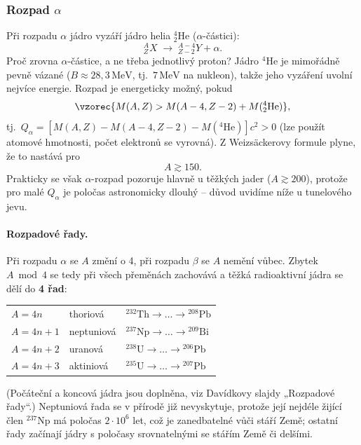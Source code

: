 \subsubsection{Rozpad \texorpdfstring{\(\alpha\)}{alfa}}

Při rozpadu \(\alpha\) jádro vyzáří jádro helia \({}^4_2\mathrm{He}\) (\(\alpha\)-částici):
\[
  {}^A_Z X \;\to\; {}^{A-4}_{Z-2} Y + \alpha .
\]
Proč zrovna \(\alpha\)-částice, a ne třeba jednotlivý proton? Jádro \({}^4\mathrm{He}\) je mimořádně pevně vázané
(\(B\approx 28{,}3\,\mathrm{MeV}\), tj.\ \(7\,\mathrm{MeV}\) na nukleon), takže jeho vyzáření uvolní nejvíce energie.
Rozpad je energeticky možný, pokud
\[
  \vzorec{M(A,Z) > M(A-4,Z-2) + M({}^4_2\mathrm{He})} ,
\]
tj.\ \(Q_\alpha = [M(A,Z) - M(A-4,Z-2) - M({}^4\mathrm{He})]c^2 > 0\) (lze použít atomové hmotnosti, počet elektronů
se vyrovná). Z Weizsäckerovy formule plyne, že to nastává pro
\[
  A \gtrsim 150 .
\]
Prakticky se však \(\alpha\)-rozpad pozoruje hlavně u těžkých jader (\(A\gtrsim 200\)), protože pro malé \(Q_\alpha\)
je poločas astronomicky dlouhý -- důvod uvidíme níže u tunelového jevu.

\paragraph{Rozpadové řady.} Při rozpadu \(\alpha\) se \(A\) změní o 4, při rozpadu \(\beta\) se \(A\) nemění vůbec.
Zbytek \(A \bmod 4\) se tedy při všech přeměnách zachovává a těžká radioaktivní jádra se dělí do
\textbf{4 řad}:
\begin{center}
\begin{tabular}{lll}
  \(A = 4n\)   & thoriová    & \({}^{232}\mathrm{Th}\to\dots\to{}^{208}\mathrm{Pb}\)\\
  \(A = 4n+1\) & neptuniová  & \({}^{237}\mathrm{Np}\to\dots\to{}^{209}\mathrm{Bi}\)\\
  \(A = 4n+2\) & uranová     & \({}^{238}\mathrm{U}\to\dots\to{}^{206}\mathrm{Pb}\)\\
  \(A = 4n+3\) & aktiniová   & \({}^{235}\mathrm{U}\to\dots\to{}^{207}\mathrm{Pb}\)
\end{tabular}
\end{center}
(Počáteční a koncová jádra jsou doplněna, viz Davídkovy slajdy „Rozpadové řady“.) Neptuniová řada se v přírodě
již nevyskytuje, protože její nejdéle žijící člen \({}^{237}\mathrm{Np}\) má poločas \(2\cdot10^6\) let, což je
zanedbatelné vůči stáří Země; ostatní řady začínají jádry s poločasy srovnatelnými se stářím Země či delšími.

